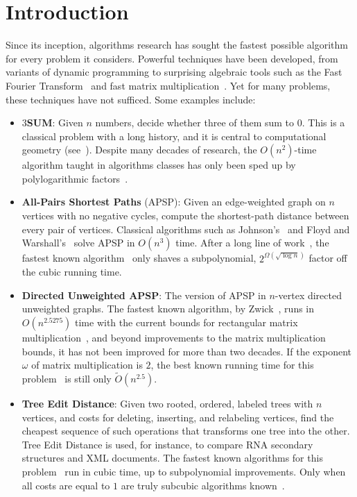 \section{Introduction}\label{sec:intro}

Since its inception, algorithms research has sought the fastest possible algorithm for every problem it considers. Powerful techniques have been developed, from variants of dynamic programming to surprising algebraic tools such as the Fast Fourier Transform~\cite{CT65} and fast matrix multiplication~\cite{Str69}. Yet for many problems, these techniques have not sufficed. Some examples include:

\begin{itemize}
\item \textbf{$3$SUM}: Given $n$ numbers, decide whether three of them sum to $0$. 
This is a classical problem with a long history, and it is central to computational geometry (see~\cite{GO95}). Despite many decades of research, the $O(n^2)$-time algorithm taught in algorithms classes has only been sped up by polylogarithmic factors~\cite{BDP08,GP18,Cha20}.


\item \textbf{All-Pairs Shortest Paths} (APSP): Given an edge-weighted graph on $n$ vertices with no negative cycles, compute the shortest-path distance between every pair of vertices. 
Classical algorithms such as Johnson's~\cite{Joh77} and Floyd and Warshall's~\cite{Flo62,War62} solve APSP in $O(n^3)$ time. After a long line of work~\cite{Fre76,Tak92,Dob90,Han04,Tak04,Tak05,Zwi06,Cha08,Han08,Cha10,HT16}, the fastest known algorithm~\cite{Wil18} only shaves a subpolynomial, $2^{\Omega(\sqrt{\log n})}$ factor off the cubic running time.
 
\item \textbf{Directed Unweighted APSP}: The version of APSP in $n$-vertex directed unweighted graphs. The fastest known algorithm, by Zwick~\cite{Zwi02}, runs in $O(n^{2.5275})$ time with the current bounds for rectangular matrix multiplication~\cite{ADVXXZ25}, and beyond improvements to the matrix multiplication bounds, it has not been improved for more than two decades. If the exponent $\omega$ of matrix multiplication is $2$, the best known running time for this problem~\cite{AGM97,Zwi02} is still only $\tilde{O}(n^{2.5})$.



\item \textbf{Tree Edit Distance}: Given two rooted, ordered, labeled trees with $n$ vertices, and costs for deleting, inserting, and relabeling vertices, find the cheapest sequence of such operations that transforms one tree into the other. Tree Edit Distance is used, for instance, to compare RNA secondary structures and XML documents. The fastest known algorithms for this problem~\cite{DMRW09,NPSVXY25} run in cubic time, up to subpolynomial improvements. Only when all costs are equal to $1$ are truly subcubic algorithms known~\cite{Mao21,Dur23,NPSVXY25}.



\end{itemize}
